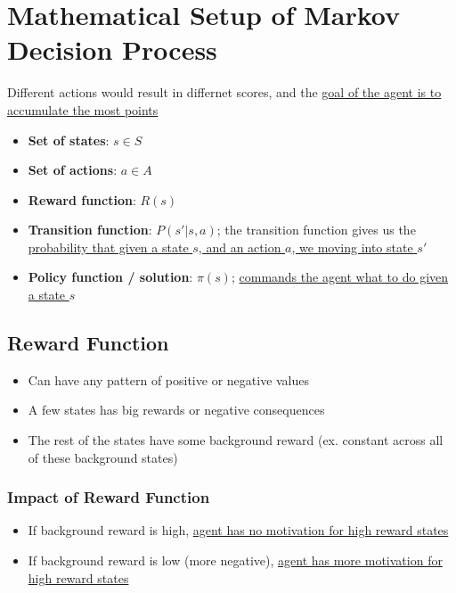 \section{Mathematical Setup of Markov Decision Process}

  Different actions would result in differnet scores, and the
  \ul{goal of the agent is to accumulate the most points}

  \begin{itemize}
    \item \textbf{Set of states}: $ s \in S $
    \item \textbf{Set of actions}: $ a \in A $
    \item \textbf{Reward function}: $ R\left( s \right) $
    \item \textbf{Transition function}: $ P\left( s' | s, a \right) $;
    the transition function gives us the \ul{probability that
    given a state $ s $, and an action $ a $, we moving into state $ s' $}
    \item \textbf{Policy function / solution}: $ \pi\left( s \right) $;
    \ul{commands the agent what to do given a state $ s $}
  \end{itemize}

  \subsection{Reward Function}

    \begin{itemize}
      \item Can have any pattern of positive or negative values
      \item A few states has big rewards or negative consequences
      \item The rest of the states have some background reward (ex.
      constant across all of these background states)
    \end{itemize}

    \subsubsection{Impact of Reward Function}

      \begin{itemize}
        \item If background reward is high, \ul{agent has no motivation
        for high reward states}
        \item If background reward is low (more negative), \ul{agent
        has more motivation for high reward states}
      \end{itemize}

